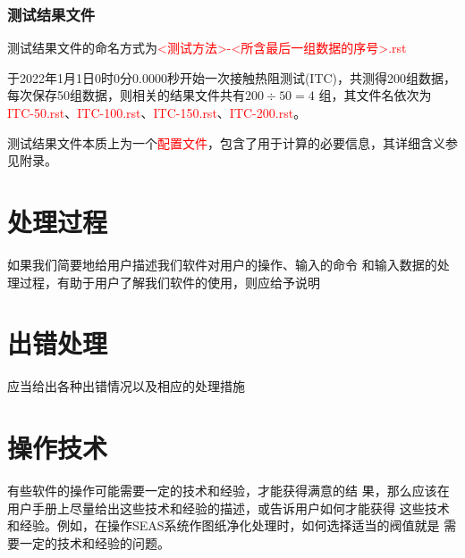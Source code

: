 \subsubsection*{测试结果文件}
测试结果文件的命名方式为\textcolor{red}{<测试方法>-<所含最后一组数据的序号>.rst}
\begin{example}
    于2022年1月1日0时0分0.0000秒开始一次接触热阻测试(ITC)，共测得200组数据，每次保存50组数据，则相关的结果文件共有$200\div 50 = 4$
    组，其文件名依次为\textcolor{red}{ITC-50.rst}、\textcolor{red}{ITC-100.rst}、\textcolor{red}{ITC-150.rst}、\textcolor{red}{ITC-200.rst}。
\end{example}
测试结果文件本质上为一个\textcolor{red}{配置文件}，包含了用于计算的必要信息，其详细含义参见附录。

\section{处理过程}
如果我们简要地给用户描述我们软件对用户的操作、输入的命令
和输入数据的处理过程，有助于用户了解我们软件的使用，则应给予说明
\section{出错处理}
应当给出各种出错情况以及相应的处理措施
\section{操作技术}
有些软件的操作可能需要一定的技术和经验，才能获得满意的结
果，那么应该在用户手册上尽量给出这些技术和经验的描述，或告诉用户如何才能获得
这些技术和经验。例如，在操作SEAS系统作图纸净化处理时，如何选择适当的阀值就是
需要一定的技术和经验的问题。